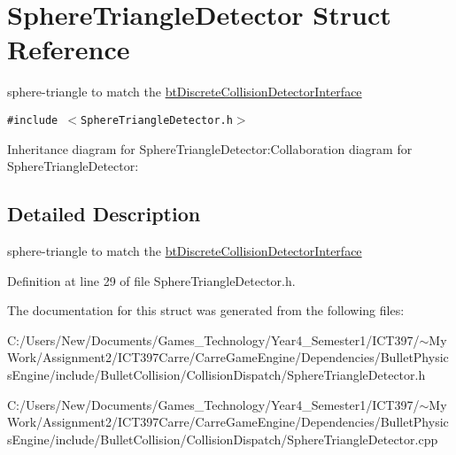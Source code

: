 \hypertarget{struct_sphere_triangle_detector}{
\section{SphereTriangleDetector Struct Reference}
\label{struct_sphere_triangle_detector}
}
sphere-triangle to match the \hyperlink{structbt_discrete_collision_detector_interface}{btDiscreteCollisionDetectorInterface}  


{\tt \#include $<$SphereTriangleDetector.h$>$}

Inheritance diagram for SphereTriangleDetector:Collaboration diagram for SphereTriangleDetector:

\subsection{Detailed Description}
sphere-triangle to match the \hyperlink{structbt_discrete_collision_detector_interface}{btDiscreteCollisionDetectorInterface} 

Definition at line 29 of file SphereTriangleDetector.h.

The documentation for this struct was generated from the following files:\begin{CompactItemize}
\item 
C:/Users/New/Documents/Games\_\-Technology/Year4\_\-Semester1/ICT397/$\sim$My Work/Assignment2/ICT397Carre/CarreGameEngine/Dependencies/BulletPhysicsEngine/include/BulletCollision/CollisionDispatch/SphereTriangleDetector.h\item 
C:/Users/New/Documents/Games\_\-Technology/Year4\_\-Semester1/ICT397/$\sim$My Work/Assignment2/ICT397Carre/CarreGameEngine/Dependencies/BulletPhysicsEngine/include/BulletCollision/CollisionDispatch/SphereTriangleDetector.cpp\end{CompactItemize}
